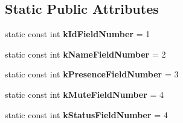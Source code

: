 \subsection*{Static Public Attributes}
\begin{DoxyCompactItemize}
\item 
\hypertarget{classSimpleChat_1_1User_add8dabbd4cc64cf9bcbb0d64d2e7c18c}{static const int {\bfseries k\-Id\-Field\-Number} = 1}\label{classSimpleChat_1_1User_add8dabbd4cc64cf9bcbb0d64d2e7c18c}

\item 
\hypertarget{classSimpleChat_1_1User_aff843866ad3c9041af98dd7fe22274af}{static const int {\bfseries k\-Name\-Field\-Number} = 2}\label{classSimpleChat_1_1User_aff843866ad3c9041af98dd7fe22274af}

\item 
\hypertarget{classSimpleChat_1_1User_ac514bbc5ec69701baccb473d41f11d93}{static const int {\bfseries k\-Presence\-Field\-Number} = 3}\label{classSimpleChat_1_1User_ac514bbc5ec69701baccb473d41f11d93}

\item 
\hypertarget{classSimpleChat_1_1User_a70dc40535f467c770ba9a744e70f9138}{static const int {\bfseries k\-Mute\-Field\-Number} = 4}\label{classSimpleChat_1_1User_a70dc40535f467c770ba9a744e70f9138}

\item 
\hypertarget{classSimpleChat_1_1User_aad7c594d0c8d4e503478edcb6aa6ff84}{static const int {\bfseries k\-Status\-Field\-Number} = 4}\label{classSimpleChat_1_1User_aad7c594d0c8d4e503478edcb6aa6ff84}

\end{DoxyCompactItemize}
